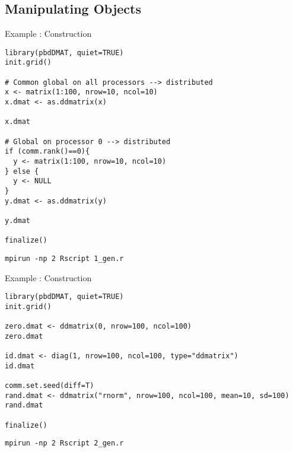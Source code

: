 
\subsection{Manipulating  Objects}

\begin{frame}
  \begin{exampleblock}{Example \countex:   Construction}\pause
\begin{lstlisting}[title=Generate a global matrix and distribute it]
library(pbdDMAT, quiet=TRUE)
init.grid()

# Common global on all processors --> distributed
x <- matrix(1:100, nrow=10, ncol=10)
x.dmat <- as.ddmatrix(x)

x.dmat

# Global on processor 0 --> distributed
if (comm.rank()==0){
  y <- matrix(1:100, nrow=10, ncol=10)
} else {
  y <- NULL
}
y.dmat <- as.ddmatrix(y)

y.dmat

finalize()
\end{lstlisting}
\begin{lstlisting}[basicstyle=\tiny,backgroundcolor=\color{white},keywordstyle=\color{black},
title=\fontsize{6pt}{7.2}\selectfont Execute this script via:]
mpirun -np 2 Rscript 1_gen.r
\end{lstlisting} 
  \end{exampleblock}
\end{frame}



\begin{frame}[fragile]
  \begin{exampleblock}{Example \countex:   Construction}\pause
\begin{lstlisting}[title=Generate locally only what is needed]
library(pbdDMAT, quiet=TRUE)
init.grid()

zero.dmat <- ddmatrix(0, nrow=100, ncol=100)
zero.dmat

id.dmat <- diag(1, nrow=100, ncol=100, type="ddmatrix")
id.dmat

comm.set.seed(diff=T)
rand.dmat <- ddmatrix("rnorm", nrow=100, ncol=100, mean=10, sd=100)
rand.dmat

finalize()
\end{lstlisting}
\begin{lstlisting}[basicstyle=\tiny,backgroundcolor=\color{white},keywordstyle=\color{black},
title=\fontsize{6pt}{7.2}\selectfont Execute this script via:]
mpirun -np 2 Rscript 2_gen.r
\end{lstlisting} 
  \end{exampleblock}
\end{frame}



